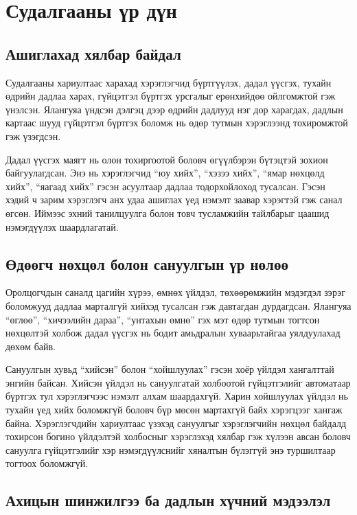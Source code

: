 \section{Судалгааны үр дүн}

\subsection{Ашиглахад хялбар байдал}

Судалгааны хариултаас харахад хэрэглэгчид бүртгүүлэх, дадал үүсгэх, тухайн өдрийн дадлаа харах, гүйцэтгэл бүртгэх урсгалыг ерөнхийдөө ойлгомжтой гэж үнэлсэн. Ялангуяа үндсэн дэлгэц дээр өдрийн дадлууд нэг дор харагдах, дадлын картаас шууд гүйцэтгэл бүртгэх боломж нь өдөр тутмын хэрэглээнд тохиромжтой гэж үзэгдсэн.

Дадал үүсгэх маягт нь олон тохиргоотой боловч өгүүлбэрэн бүтэцтэй зохион байгуулагдсан. Энэ нь хэрэглэгчид ``юу хийх'', ``хэзээ хийх'', ``ямар нөхцөлд хийх'', ``яагаад хийх'' гэсэн асуултаар дадлаа тодорхойлоход тусалсан. Гэсэн хэдий ч зарим хэрэглэгч анх удаа ашиглах үед нэмэлт заавар хэрэгтэй гэж санал өгсөн. Иймээс эхний танилцуулга болон товч тусламжийн тайлбарыг цаашид нэмэгдүүлэх шаардлагатай.

\subsection{Өдөөгч нөхцөл болон сануулгын үр нөлөө}

Оролцогчдын саналд цагийн хүрээ, өмнөх үйлдэл, төхөөрөмжийн мэдэгдэл зэрэг боломжууд дадлаа марталгүй хийхэд тусалсан гэж давтагдан дурдагдсан. Ялангуяа ``өглөө'', ``хичээлийн дараа'', ``унтахын өмнө'' гэх мэт өдөр тутмын тогтсон нөхцөлтэй холбож дадал үүсгэх нь бодит амьдралын хуваарьтайгаа уялдуулахад дөхөм байв.

Сануулгын хувьд ``хийсэн'' болон ``хойшлуулах'' гэсэн хоёр үйлдэл хангалттай энгийн байсан. Хийсэн үйлдэл нь сануулгатай холбоотой гүйцэтгэлийг автоматаар бүртгэх тул хэрэглэгчээс нэмэлт алхам шаардахгүй. Харин хойшлуулах үйлдэл нь тухайн үед хийх боломжгүй боловч бүр мөсөн мартахгүй байх хэрэгцээг хангаж байна. Хэрэглэгчдийн хариултаас үзэхэд сануулгыг хэрэглэгчийн нөхцөл байдалд тохирсон богино үйлдэлтэй холбосныг хэрэглэхэд хялбар гэж хүлээн авсан боловч сануулга гүйцэтгэлийг хэр нэмэгдүүлснийг хяналтын бүлэггүй энэ туршилтаар тогтоох боломжгүй.

\subsection{Ахицын шинжилгээ ба дадлын хүчний мэдээлэл}

